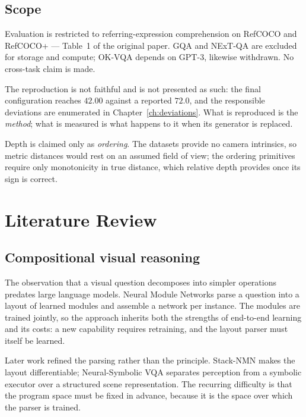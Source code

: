 \documentclass[12pt,a4paper,oneside]{report}
\begin{document}
\section{Scope}

Evaluation is restricted to referring-expression comprehension on RefCOCO and
RefCOCO+ --- Table~1 of the original paper. GQA and NExT-QA are excluded for storage
and compute; OK-VQA depends on GPT-3, likewise withdrawn. No cross-task claim is made.

The reproduction is not faithful and is not presented as such: the final configuration
reaches $42.00$ against a reported $72.0$, and the responsible deviations are
enumerated in Chapter~\ref{ch:deviations}. What is reproduced is the \emph{method};
what is measured is what happens to it when its generator is replaced.

Depth is claimed only as \emph{ordering}. The datasets provide no camera intrinsics,
so metric distances would rest on an assumed field of view; the ordering primitives
require only monotonicity in true distance, which relative depth provides once its
sign is correct.

\chapter{Literature Review}
\label{ch:literature}

\section{Compositional visual reasoning}

The observation that a visual question decomposes into simpler operations predates
large language models. Neural Module Networks \cite{andreas2016nmn} parse a question
into a layout of learned modules and assemble a network per instance. The modules are
trained jointly, so the approach inherits both the strengths of end-to-end learning
and its costs: a new capability requires retraining, and the layout parser must itself
be learned.

Later work refined the parsing rather than the principle. Stack-NMN
\cite{hu2018stacknmn} makes the layout differentiable; Neural-Symbolic VQA
\cite{yi2018nsvqa} separates perception from a symbolic executor over a structured
scene representation. The recurring difficulty is that the program space must be fixed
in advance, because it is the space over which the parser is trained.
\end{document}

